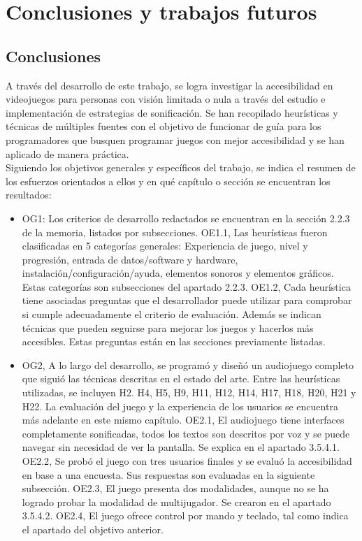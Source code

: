 \chapter{Conclusiones y trabajos futuros}
\section{Conclusiones}

A través del desarrollo de este trabajo, se logra investigar la accesibilidad en videojuegos para personas con visión limitada o nula a través del estudio e implementación de estrategias de sonificación. Se han recopilado heurísticas y técnicas de múltiples fuentes con el objetivo de funcionar de guía para los programadores que busquen programar juegos con mejor accesibilidad y se han aplicado de manera práctica.\\

Siguiendo los objetivos generales y específicos del trabajo, se indica el resumen de los esfuerzos orientados a ellos y en qué capítulo o sección se encuentran los resultados:

\begin{itemize}
	\item OG1: Los criterios de desarrollo redactados se encuentran en la sección 2.2.3 de la memoria, listados por subsecciones. 
	\subitem OE1.1, Las heurísticas fueron clasificadas en 5 categorías generales: Experiencia de juego, nivel y progresión, entrada de datos/software y hardware, instalación/configuración/ayuda, elementos sonoros y elementos gráficos. Estas categorías son subsecciones del apartado 2.2.3.
	\subitem OE1.2, Cada heurística tiene asociadas preguntas que el desarrollador puede utilizar para comprobar si cumple adecuadamente el criterio de evaluación. Además se indican técnicas que pueden seguirse para mejorar los juegos y hacerlos más accesibles. Estas preguntas están en las secciones previamente listadas.
	\item OG2, A lo largo del desarrollo, se programó y diseñó un audiojuego completo que siguió las técnicas descritas en el estado del arte. Entre las heurísticas utilizadas, se incluyen H2. H4, H5, H9, H11, H12, H14, H17, H18, H20, H21 y H22. La evaluación del juego y la experiencia de los usuarios se encuentra más adelante en este mismo capítulo.
	\subitem OE2.1, El audiojuego tiene interfaces completamente sonificadas, todos los textos son descritos por voz y se puede navegar sin necesidad de ver la pantalla. Se explica en el apartado 3.5.4.1.
	\subitem OE2.2, Se probó el juego con tres usuarios finales y se evaluó la accesibilidad en base a una encuesta. Sus respuestas son evaluadas en la siguiente subsección.
	\subitem OE2.3, El juego presenta dos modalidades, aunque no se ha logrado probar la modalidad de multijugador. Se crearon en el apartado 3.5.4.2.
	\subitem OE2.4, El juego ofrece control por mando y teclado, tal como indica el apartado del objetivo anterior.
\end{itemize}

